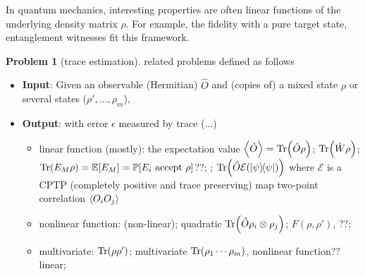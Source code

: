 \documentclass[
aps,
pra,
floatfix,
]{revtex4-2}
\theoremstyle{plain}
\theoremstyle{definition}
\newtheorem{problem}{Problem}
\newcommand{\ew}{\hat{W}}
\newcommand{\ob}{\hat{O}}
\newcommand{\dm}{\rho}
\begin{document}
In quantum mechanics, interesting properties are often linear functions of the underlying density matrix $\dm$.
For example, the fidelity with a pure target state, entanglement witnesses fit this framework.
\begin{problem}[trace estimation]\label{prm:trace_estimation}
	related problems defined as follows
	\begin{itemize}
		\item \textbf{Input}: Given an observable (Hermitian) $\ob$ and (copies of) a mixed state $\dm$ or several states ($\dm',\dots,\dm_m$), 
		\item \textbf{Output}: with error $\epsilon$ measured by trace  (...)
		\begin{itemize}
			\item linear function (mostly):
			the expectation value $\expval{\ob}=\Tr(\ob \dm) $; 
			 $\Tr(\ew\dm)$;
			 $\Tr(E_M\dm) = \expectation[E_M] = \probability[E_i \text{ accept } \dm]$??;
			;
			$\Tr(\ob\mathcal{E}(\op{\psi}))$ where $\mathcal{E}$ is a CPTP (completely positive and trace preserving) map
			two-point correlation $\expval{O_iO_j}$

			\item nonlinear function:
			 (non-linear); quadratic $\Tr(\ob \dm_i \otimes \dm_j)$;
			 $F(\dm,\dm')$, ??;

			\item multivariate: 
			 $\Tr(\dm\dm')$;
			multivariate $\Tr(\dm_1 \cdots \dm_m)$, nonlinear function?? linear;
		\end{itemize}
	\end{itemize}
\end{problem}
\end{document}
